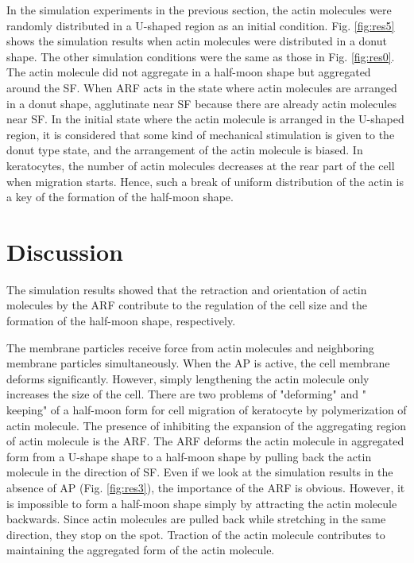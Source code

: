 \documentclass[a4paper,12pt, oneside]{book}
\begin{document}
In the simulation experiments in the previous section, the actin molecules were randomly distributed in a U-shaped region as an initial condition.
Fig. \ref{fig:res5} shows the simulation results when actin molecules were distributed in a donut shape.
The other simulation conditions were the same as those in Fig. \ref{fig:res0}.
The actin molecule did not aggregate in a half-moon shape but aggregated around the SF.
When ARF acts in the state where actin molecules are arranged in a donut shape, agglutinate near SF because there are already actin molecules near SF.
In the initial state where the actin molecule is arranged in the U-shaped region, it is considered that some kind of mechanical stimulation is given to the donut type state, and the arrangement of the actin molecule is biased.
In keratocytes, the number of actin molecules decreases at the rear part of the cell when migration starts.
Hence, such a break of uniform distribution of the actin is a key of the formation of the half-moon shape.  

\section{Discussion}
The simulation results showed that the retraction and orientation of actin molecules by the ARF contribute to the regulation of the cell size and the formation of the half-moon shape, respectively.

The membrane particles receive force from actin molecules and neighboring membrane particles simultaneously.
When the AP is active, the cell membrane deforms significantly. 
However, simply lengthening the actin molecule only increases the size of the cell.
There are two problems of "deforming" and " keeping" of a half-moon form for cell migration of keratocyte by polymerization of actin molecule.
The presence of inhibiting the expansion of the aggregating region of actin molecule is the ARF.
The ARF deforms the actin molecule in aggregated form from a U-shape shape to a half-moon shape by pulling back the actin molecule in the direction of SF.
Even if we look at the simulation results in the absence of AP (Fig. \ref{fig:res3}), the importance of the ARF is obvious.
However, it is impossible to form a half-moon shape simply by attracting the actin molecule backwards.
Since actin molecules are pulled back while stretching in the same direction, they stop on the spot.
Traction of the actin molecule contributes to maintaining the aggregated form of the actin molecule.
\end{document}
